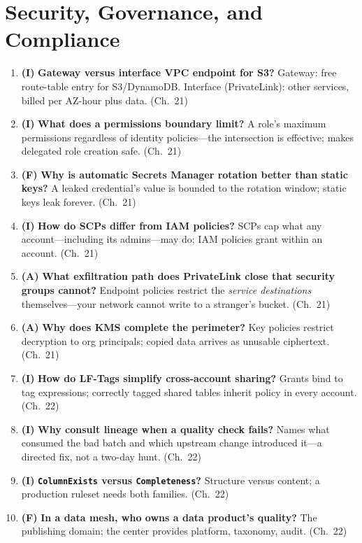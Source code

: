 \section{Security, Governance, and Compliance}
\begin{enumerate}
    \item \textbf{(I)} \textbf{Gateway versus interface VPC endpoint for S3?}
    Gateway: free route-table entry for S3/DynamoDB. Interface (PrivateLink): other services, billed
    per AZ-hour plus data. (Ch.~21)
    \item \textbf{(I)} \textbf{What does a permissions boundary limit?}
    A role's maximum permissions regardless of identity policies---the intersection is effective;
    makes delegated role creation safe. (Ch.~21)
    \item \textbf{(F)} \textbf{Why is automatic Secrets Manager rotation better than static keys?}
    A leaked credential's value is bounded to the rotation window; static keys leak forever.
    (Ch.~21)
    \item \textbf{(I)} \textbf{How do SCPs differ from IAM policies?}
    SCPs cap what any account---including its admins---may do; IAM policies grant within an
    account. (Ch.~21)
    \item \textbf{(A)} \textbf{What exfiltration path does PrivateLink close that security groups
    cannot?}
    Endpoint policies restrict the \emph{service destinations} themselves---your network cannot
    write to a stranger's bucket. (Ch.~21)
    \item \textbf{(A)} \textbf{Why does KMS complete the perimeter?}
    Key policies restrict decryption to org principals; copied data arrives as unusable ciphertext.
    (Ch.~21)
    \item \textbf{(I)} \textbf{How do LF-Tags simplify cross-account sharing?}
    Grants bind to tag expressions; correctly tagged shared tables inherit policy in every account.
    (Ch.~22)
    \item \textbf{(I)} \textbf{Why consult lineage when a quality check fails?}
    Names what consumed the bad batch and which upstream change introduced it---a directed fix, not
    a two-day hunt. (Ch.~22)
    \item \textbf{(I)} \textbf{\texttt{ColumnExists} versus \texttt{Completeness}?}
    Structure versus content; a production ruleset needs both families. (Ch.~22)
    \item \textbf{(F)} \textbf{In a data mesh, who owns a data product's quality?}
    The publishing domain; the center provides platform, taxonomy, audit. (Ch.~22)

\end{enumerate}
